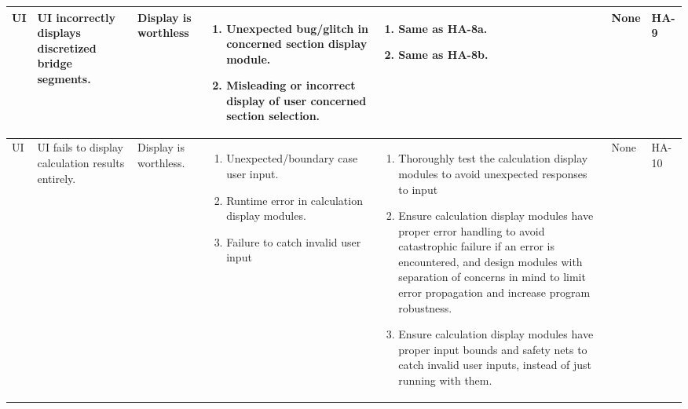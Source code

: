 \documentclass{article}
\begin{document}
\begin{landscape}
\begin{longtable}{|p{} | p{} | p{} | p{} | p{} | p{} | p{}|}
  UI & UI incorrectly displays discretized bridge segments. & Display is worthless & 
  \begin{enumerate}[leftmargin=*, label={\alph*.}, itemsep=1pt, topsep=0pt, partopsep=0pt] 
    \item Unexpected bug/glitch in concerned section display module.
    \item Misleading or incorrect display of user concerned section selection.
  \end{enumerate} &
  \begin{enumerate}[leftmargin=*, label={\alph*.}, itemsep=1pt, topsep=0pt, partopsep=0pt] 
    \item Same as HA-8a.
    \item Same as HA-8b.
  \end{enumerate} &
  None & HA-9 \\

  \hline

  UI &  UI fails to display calculation results entirely. &  Display is worthless. &
  \begin{enumerate}[leftmargin=*, label={\alph*.}, itemsep=1pt, topsep=0pt, partopsep=0pt] 
    \item Unexpected/boundary case user input.               
    \item Runtime error in calculation display modules.
    \item Failure to catch invalid user input
  \end{enumerate} &
  \begin{enumerate}[leftmargin=*, label={\alph*.}, itemsep=1pt, topsep=0pt, partopsep=0pt] 
    \item Thoroughly test the calculation display modules to avoid unexpected responses to input
    \item  Ensure calculation display modules have proper error handling to avoid catastrophic failure if an error is encountered, and design modules with separation of concerns in mind to limit error propagation and increase program robustness.
    \item Ensure calculation display modules have proper input bounds and safety nets to catch invalid user inputs, instead of just running with them.
  \end{enumerate} & 
  None & HA-10 \\

  \hline
  

\end{longtable}
\end{landscape}
\end{document}
